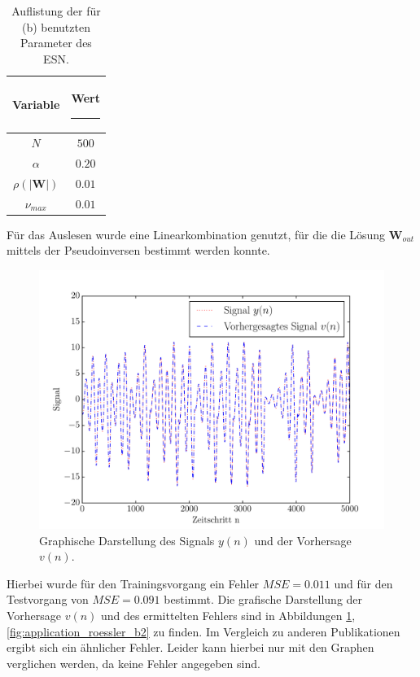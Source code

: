 \begin{table}[H]
	\centering
		\begin{tabular}{|c|c|}
		\rule[-1ex]{0pt}{4.5ex} Variable & \hspace{4ex} Wert \rule[-1ex]{4ex}{0pt}\\ 
		\hline \hline 
		\rule[-1ex]{0pt}{4.5ex} $N$ & $500$ \\ 
		\hline 
		\rule[-1ex]{0pt}{4.5ex} $\alpha$ & $0.20$ \\ 
		\hline 
		\rule[-1ex]{0pt}{4.5ex} $\rho(|\mathbf{W}|)$ & $0.01$ \\
		\hline 
		\rule[-1ex]{0pt}{4.5ex} $\nu_{max}$ & $0.01$ \\ 
		\hline 
	\end{tabular} 
	\caption{Auflistung der für (b) benutzten Parameter des \textsc{ESN}.}
\label{tab:application_roessler_b}
\end{table}

Für das Auslesen wurde eine Linearkombination genutzt, für die die Lösung $\mathbf{W}_{out}$ mittels der Pseudoinversen bestimmt werden konnte.

\begin{figure}[H]
    \centering
     \includegraphics[width = 0.9 \textwidth]{figures/roessler_cross_pred.pdf}
    \caption{Graphische Darstellung des Signals $y(n)$ und der Vorhersage $v(n)$.}
    \label{fig:application_roessler_b1}
\end{figure}

Hierbei wurde für den Trainingsvorgang ein Fehler $MSE = 0.011$ und für den Testvorgang von $MSE = 0.091$ bestimmt. Die grafische Darstellung der Vorhersage $v(n)$ und des ermittelten Fehlers sind in Abbildungen \ref{fig:application_roessler_b1}, \ref{fig:application_roessler_b2} zu finden. Im Vergleich zu anderen Publikationen \cite{parlitz2005} ergibt sich ein ähnlicher Fehler. Leider kann hierbei nur mit den Graphen verglichen werden, da keine Fehler angegeben sind.


